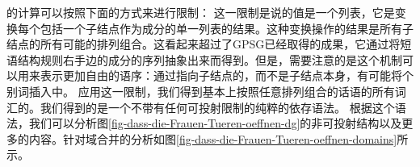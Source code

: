 \domvc 的计算可以按照下面的方式来进行限制：
\ea
{} \impl
{}
\z
这一限制是说\dom 的值是一个列表，它是变换每个包括一个子结点作为成分的单一列表的结果。这种变换操作的结果是所有子结点的所有可能的排列组合。这看起来超过了GPSG已经取得的成果，它通过将短语结构规则右手边的成分的序列抽象出来而得到。但是，需要注意的是这个机制可以用来表示更加自由的语序：通过指向子结点的\domvsc，而不是子结点本身，有可能将个别词插入\domlc 中。
\ea
{} \impl
{}
\z
应用这一限制，我们得到基本上按照任意排列组合的话语的所有词汇的\domvsc。我们得到的是一个不带有任何可投射限制的纯粹的依存语法。
根据这个语法，我们可以分析图\vref{fig-dass-die-Frauen-Tueren-oeffnen-dg}的非可投射结构以及更多的内容。针对域合并的分析如图\vref{fig-dass-die-Frauen-Tueren-oeffnen-domains}所示。
